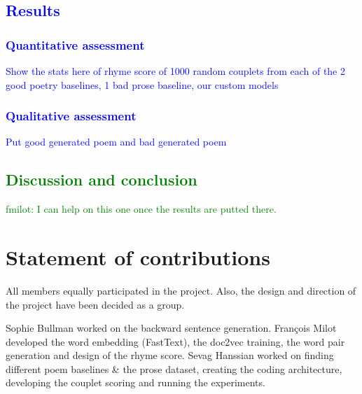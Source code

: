\documentclass[11pt,a4paper]{article}
\begin{document}
\textcolor{blue}{
\subsection{Results}
\label{sec:results}
\subsubsection{Quantitative assessment}
Show the stats here of rhyme score of 1000 random couplets from each of the 2 good poetry baselines, 1 bad prose baseline, our custom models
\subsubsection{Qualitative assessment}
Put good generated poem and bad generated poem
}

\textcolor{green}{
\section{Discussion and conclusion}
\label{sec:discconc}
fmilot: I can help on this one once the results are putted there.
}


\section{Statement of contributions}
\label{sec:contributions}
All members equally participated in the project. Also, the design and direction of the project have been decided as a group. 

Sophie Bullman worked on the backward sentence generation. François Milot developed the word embedding (FastText), the doc2vec training, the word pair generation and design of the rhyme score. Sevag Hanssian worked on finding different poem baselines \& the prose dataset, creating the coding architecture, developing the couplet scoring and running the experiments.



\end{document}
